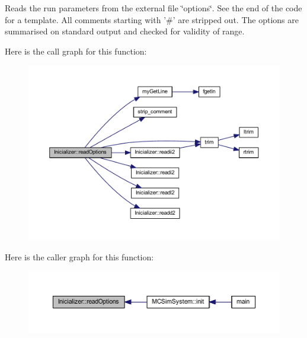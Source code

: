 Reads the run parameters from the external file \char`\"{}options\char`\"{}. See the end of the code for a template. All comments starting with '\#' are stripped out. The options are summarised on standard output and checked for validity of range. 



Here is the call graph for this function\+:\nopagebreak
\begin{figure}[H]
\begin{center}
\leavevmode
\includegraphics[width=350pt]{class_inicializer_a41ac3793bca326b7b0d47c342bebf7b4_cgraph}
\end{center}
\end{figure}




Here is the caller graph for this function\+:\nopagebreak
\begin{figure}[H]
\begin{center}
\leavevmode
\includegraphics[width=350pt]{class_inicializer_a41ac3793bca326b7b0d47c342bebf7b4_icgraph}
\end{center}
\end{figure}


